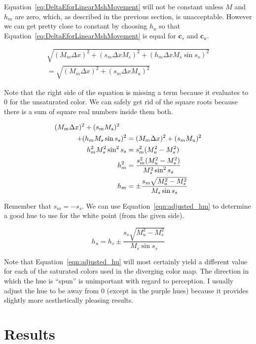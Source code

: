 \documentclass[twocolumn]{article}
\newcommand*{\cvec}[1]{\mathbf{#1}}
\begin{document}
Equation~\ref{eq:DeltaEforLinearMshMovement} will not be constant unless
$M$ and $h_m$ are zero, which, as described in the previous section, is
unacceptable.  However we can get pretty close to constant by choosing
$h_u$ so that Equation~\ref{eq:DeltaEforLinearMshMovement} is equal for
$\cvec{c}_s$ and $\cvec{c}_u$.

\begin{multline*}
  \sqrt{(M_m \Delta x)^2 + (s_m \Delta x M_s)^2 + (h_m \Delta x M_s \sin s_s)^2}
  \\ =
  \sqrt{(M_m \Delta x)^2 + (s_m \Delta x M_u)^2}
\end{multline*}

Note that the right side of the equation is missing a term because it
evaluates to 0 for the unsaturated color.  We can safely get rid of the
square roots because there is a sum of square real numbers inside them
both.

\begin{align}
    (M_m \Delta x)^2 + (s_m M_s)^2 \quad & \notag \\
    + (h_m M_s \sin s_s)^2 &= (M_m \Delta x)^2 + (s_m M_u)^2 \notag \\
    h_m^2 M_s^2 \sin^2 s_s &= s_m^2 (M_u^2 - M_s^2) \notag \\
    h_m^2 &= \frac{s_m^2 (M_u^2 - M_s^2)}{M_s^2 \sin^2 s_s} \notag \\
    h_m &= \pm \frac{s_m \sqrt{M_u^2 - M_s^2}}{M_s \sin s_s}
    \label{eqn:adjusted_hm}
\end{align}

Remember that $s_m=-s_s$.  We can use Equation~\ref{eqn:adjusted_hm} to
determine a good hue to use for the white point (from the given side).

\begin{equation}
  h_u = h_s \pm \frac{s_s \sqrt{M_u^2 - M_s^2}}{M_s \sin s_s}
  \label{eqn:adjusted_hu}
\end{equation}

Note that Equation~\ref{eqn:adjusted_hu} will most certainly yield a
different value for each of the saturated colors used in the diverging
color map.  The direction in which the hue is ``spun'' is unimportant with
regard to perception.  I usually adjust the hue to be away from 0 (except
in the purple hues) because it provides slightly more aesthetically
pleasing results.


\section{Results}
\label{sec:Results}
\end{document}
